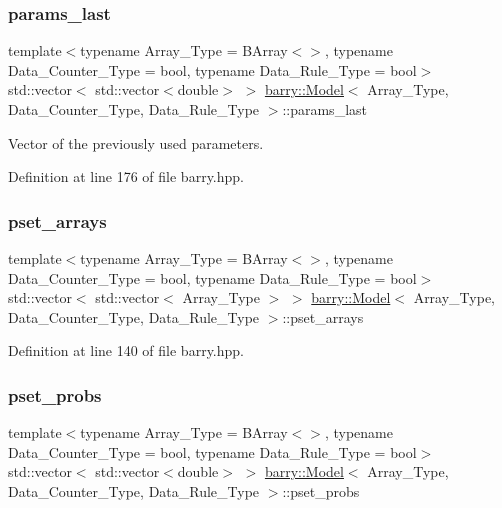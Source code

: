 \subsubsection{\texorpdfstring{params\+\_\+last}{params\_last}}
{\footnotesize\ttfamily template$<$typename Array\+\_\+\+Type  = B\+Array$<$$>$, typename Data\+\_\+\+Counter\+\_\+\+Type  = bool, typename Data\+\_\+\+Rule\+\_\+\+Type  = bool$>$ \\
std\+::vector$<$ std\+::vector$<$double$>$ $>$ \hyperlink{classbarry_1_1_model}{barry\+::\+Model}$<$ Array\+\_\+\+Type, Data\+\_\+\+Counter\+\_\+\+Type, Data\+\_\+\+Rule\+\_\+\+Type $>$\+::params\+\_\+last}



Vector of the previously used parameters. 



Definition at line 176 of file barry.\+hpp.

\mbox{\label{classbarry_1_1_model_ae5aad2049cc19ee36e9c2cfefd65a0dd}} 
\subsubsection{\texorpdfstring{pset\+\_\+arrays}{pset\_arrays}}
{\footnotesize\ttfamily template$<$typename Array\+\_\+\+Type  = B\+Array$<$$>$, typename Data\+\_\+\+Counter\+\_\+\+Type  = bool, typename Data\+\_\+\+Rule\+\_\+\+Type  = bool$>$ \\
std\+::vector$<$ std\+::vector$<$ Array\+\_\+\+Type $>$ $>$ \hyperlink{classbarry_1_1_model}{barry\+::\+Model}$<$ Array\+\_\+\+Type, Data\+\_\+\+Counter\+\_\+\+Type, Data\+\_\+\+Rule\+\_\+\+Type $>$\+::pset\+\_\+arrays}



Definition at line 140 of file barry.\+hpp.

\mbox{\label{classbarry_1_1_model_a4ccabb6842238fa5c7ff3476ef760423}} 
\subsubsection{\texorpdfstring{pset\+\_\+probs}{pset\_probs}}
{\footnotesize\ttfamily template$<$typename Array\+\_\+\+Type  = B\+Array$<$$>$, typename Data\+\_\+\+Counter\+\_\+\+Type  = bool, typename Data\+\_\+\+Rule\+\_\+\+Type  = bool$>$ \\
std\+::vector$<$ std\+::vector$<$double$>$ $>$ \hyperlink{classbarry_1_1_model}{barry\+::\+Model}$<$ Array\+\_\+\+Type, Data\+\_\+\+Counter\+\_\+\+Type, Data\+\_\+\+Rule\+\_\+\+Type $>$\+::pset\+\_\+probs}



